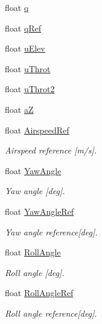 \begin{DoxyCompactItemize}
float \hyperlink{struct____mavlink__aslctrl__data__t_a29371935ef3b92d1c49d19224218f0fc}{q}
\item 
float \hyperlink{struct____mavlink__aslctrl__data__t_a0a4b0d98eba352ab59360f0582aca6ce}{q\+Ref}
\item 
float \hyperlink{struct____mavlink__aslctrl__data__t_af8b5c802abe91f36da43009d401d8551}{u\+Elev}
\item 
float \hyperlink{struct____mavlink__aslctrl__data__t_a7a78c8037eed0ad9c6f4a85a9b17ed4d}{u\+Throt}
\item 
float \hyperlink{struct____mavlink__aslctrl__data__t_a341bac576c8354e77d177d78c4b32f9e}{u\+Throt2}
\item 
float \hyperlink{struct____mavlink__aslctrl__data__t_a31100970ea83829b22ac9674c76deffd}{a\+Z}
\item 
float \hyperlink{struct____mavlink__aslctrl__data__t_a38893cda3ac10629d58aa857727d54a4}{Airspeed\+Ref}
\begin{DoxyCompactList}\small\item\em Airspeed reference \mbox{[}m/s\mbox{]}. \end{DoxyCompactList}\item 
float \hyperlink{struct____mavlink__aslctrl__data__t_a1ba87fc3d1977253edc450cadfb19959}{Yaw\+Angle}
\begin{DoxyCompactList}\small\item\em Yaw angle \mbox{[}deg\mbox{]}. \end{DoxyCompactList}\item 
float \hyperlink{struct____mavlink__aslctrl__data__t_a2a8330900c135e9421488b59e1956d4e}{Yaw\+Angle\+Ref}
\begin{DoxyCompactList}\small\item\em Yaw angle reference\mbox{[}deg\mbox{]}. \end{DoxyCompactList}\item 
float \hyperlink{struct____mavlink__aslctrl__data__t_ab1ba48fbecfa831f370cefe53bcbabac}{Roll\+Angle}
\begin{DoxyCompactList}\small\item\em Roll angle \mbox{[}deg\mbox{]}. \end{DoxyCompactList}\item 
float \hyperlink{struct____mavlink__aslctrl__data__t_a948c2095f693bbcd490e98077949c6f2}{Roll\+Angle\+Ref}
\begin{DoxyCompactList}\small\item\em Roll angle reference\mbox{[}deg\mbox{]}. \end{DoxyCompactList}\item 

\end{DoxyCompactItemize}
